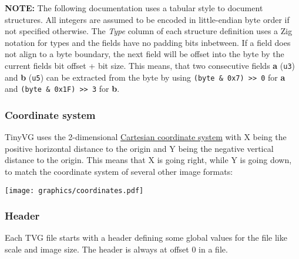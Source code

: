 \documentclass[
]{article}
\begin{document}
\textbf{NOTE:} The following documentation uses a tabular style to
document structures. All integers are assumed to be encoded in
little-endian byte order if not specified otherwise. The \emph{Type}
column of each structure definition uses a Zig notation for types and
the fields have no padding bits inbetween. If a field does not align to
a byte boundary, the next field will be offset into the byte by the
current fields bit offset + bit size. This means, that two consecutive
fields \textbf{a} (\texttt{u3}) and \textbf{b} (\texttt{u5}) can be
extracted from the byte by using
\texttt{(byte\ \&\ 0x7)\ \textgreater{}\textgreater{}\ 0} for \textbf{a}
and \texttt{(byte\ \&\ 0x1F)\ \textgreater{}\textgreater{}\ 3} for
\textbf{b}.

\hypertarget{coordinate-system}{%
\subsubsection{Coordinate system}\label{coordinate-system}}

TinyVG uses the 2-dimensional
\href{https://en.wikipedia.org/wiki/Cartesian_coordinate_system}{Cartesian
coordinate system} with X being the positive horizontal distance to the
origin and Y being the negative vertical distance to the origin. This
means that X is going right, while Y is going down, to match the
coordinate system of several other image formats:

\texttt{[image: graphics/coordinates.pdf]}

\hypertarget{header}{%
\subsubsection{Header}\label{header}}

Each TVG file starts with a header defining some global values for the
file like scale and image size. The header is always at offset 0 in a
file.
\end{document}
